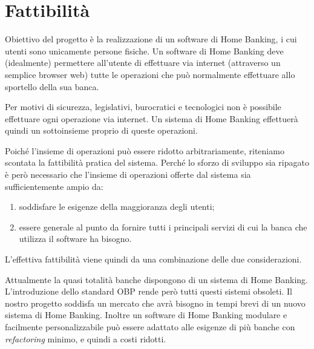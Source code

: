 \documentclass[10pt]{softeng} %
\begin{document}
\flushbottom %

\maketitle %

\tableofcontents %

\thispagestyle{empty} %


\section{Fattibilit\`a}

Obiettivo del progetto \`e la realizzazione di un software di Home Banking, i cui utenti sono unicamente persone fisiche.
Un software di Home Banking deve (idealmente) permettere all'utente di effettuare via internet (attraverso un semplice browser web) tutte le operazioni che pu\`o normalmente effettuare allo sportello della sua banca.

Per motivi di sicurezza, legislativi, burocratici e tecnologici non \`e possibile effettuare ogni operazione via internet.
Un sistema di Home Banking effettuer\`a quindi un sottoinsieme proprio di queste operazioni.

Poich\'e l'insieme di operazioni pu\`o essere ridotto arbitrariamente, riteniamo scontata la fattibilit\`a pratica del sistema.
Perch\'e lo sforzo di sviluppo sia ripagato \`e per\`o necessario che l'insieme di operazioni offerte dal sistema sia sufficientemente ampio da:
\begin{enumerate}
	\item soddisfare le esigenze della maggioranza degli utenti;
	\item essere generale al punto da fornire tutti i principali servizi di cui la banca che utilizza il software ha bisogno.
\end{enumerate}
L'effettiva fattibilit\`a viene quindi da una combinazione delle due considerazioni.

Attualmente la quasi totalit\`a banche dispongono di un sistema di Home Banking.
L'introduzione dello standard OBP rende per\`o tutti questi sistemi obsoleti.
Il nostro progetto soddisfa un mercato che avr\`a bisogno in tempi brevi di un nuovo sistema di Home Banking.
Inoltre un software di Home Banking modulare e facilmente personalizzabile pu\`o essere adattato alle esigenze di pi\`u banche con \emph{refactoring} minimo, e quindi a costi ridotti.
\end{document}
